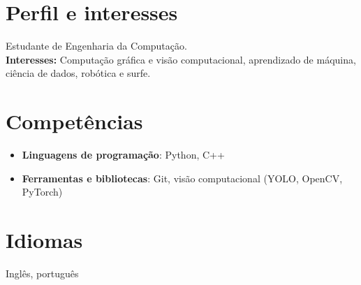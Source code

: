 \documentclass[a4paper,10pt]{article}
\begin{document}
\section*{Perfil e interesses}
\noindent Estudante de Engenharia da Computação. \\
\textbf{Interesses:} Computação gráfica e visão computacional, aprendizado de máquina, ciência de dados, robótica e surfe.

\section*{Competências}
\begin{itemize}[leftmargin=*, noitemsep, topsep=0pt]
    \item \textbf{Linguagens de programação}: Python, C++
    \item \textbf{Ferramentas e bibliotecas}: Git, visão computacional (YOLO, OpenCV, PyTorch)
\end{itemize}


\section*{Idiomas}
\noindent Inglês, português
\end{document}
